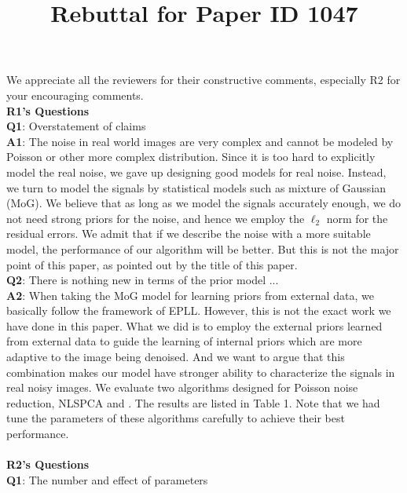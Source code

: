 \documentclass[10pt,twocolumn,letterpaper]{article}
\begin{document}
\title{Rebuttal for Paper ID 1047}  %

\maketitle
\thispagestyle{empty}



We appreciate all the reviewers for their constructive comments, especially R2 for your encouraging comments.
\\
\textbf{R1's Questions}
\\
\textbf{Q1}: Overstatement of claims
\\
\textbf{A1}: The noise in real world images are very complex and cannot be modeled by Poisson or other more complex distribution. Since it is too hard to explicitly model the real noise, we gave up designing good models for real noise. Instead, we turn to model the signals by statistical models such as mixture of Gaussian (MoG). We believe that as long as we model the signals accurately enough, we do not need strong priors for the noise, and hence we employ the $\ell_{2}$ norm for the residual errors. We admit that if we describe the noise with a more suitable model, the performance of our algorithm will be better. But this is not the major point of this paper, as pointed out by the title of this paper.
\\
\textbf{Q2}: There is nothing new in terms of the prior model ...
\\
\textbf{A2}: When taking the MoG model for learning priors from external data, we basically follow the framework of EPLL. However, this is not the exact work we have done in this paper. What we did is to employ the external priors learned from external data to guide the learning of internal priors which are more adaptive to the image being denoised. And we want to argue that this combination makes our model have stronger ability to characterize the signals in real noisy images. We evaluate two algorithms designed for Poisson noise reduction, NLSPCA \cite{nlpca} and \cite{makitalo2013optimal}. The results are listed in Table 1. Note that we had tune the parameters of these algorithms carefully to achieve their best performance.
\\
\\
\textbf{R2's Questions}
\\
\textbf{Q1}: The number and effect of parameters
\\
\end{document}
